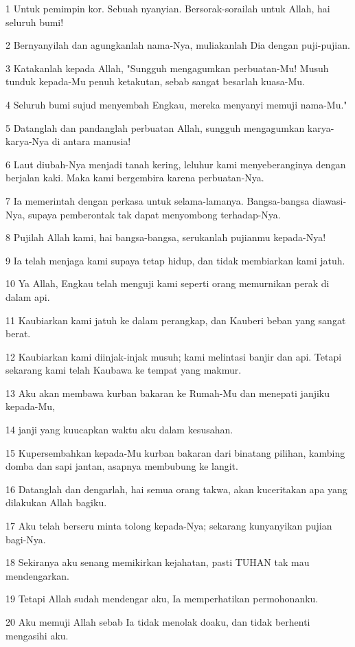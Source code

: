 \par 1 Untuk pemimpin kor. Sebuah nyanyian. Bersorak-sorailah untuk Allah, hai seluruh bumi!
\par 2 Bernyanyilah dan agungkanlah nama-Nya, muliakanlah Dia dengan puji-pujian.
\par 3 Katakanlah kepada Allah, "Sungguh mengagumkan perbuatan-Mu! Musuh tunduk kepada-Mu penuh ketakutan, sebab sangat besarlah kuasa-Mu.
\par 4 Seluruh bumi sujud menyembah Engkau, mereka menyanyi memuji nama-Mu."
\par 5 Datanglah dan pandanglah perbuatan Allah, sungguh mengagumkan karya-karya-Nya di antara manusia!
\par 6 Laut diubah-Nya menjadi tanah kering, leluhur kami menyeberanginya dengan berjalan kaki. Maka kami bergembira karena perbuatan-Nya.
\par 7 Ia memerintah dengan perkasa untuk selama-lamanya. Bangsa-bangsa diawasi-Nya, supaya pemberontak tak dapat menyombong terhadap-Nya.
\par 8 Pujilah Allah kami, hai bangsa-bangsa, serukanlah pujianmu kepada-Nya!
\par 9 Ia telah menjaga kami supaya tetap hidup, dan tidak membiarkan kami jatuh.
\par 10 Ya Allah, Engkau telah menguji kami seperti orang memurnikan perak di dalam api.
\par 11 Kaubiarkan kami jatuh ke dalam perangkap, dan Kauberi beban yang sangat berat.
\par 12 Kaubiarkan kami diinjak-injak musuh; kami melintasi banjir dan api. Tetapi sekarang kami telah Kaubawa ke tempat yang makmur.
\par 13 Aku akan membawa kurban bakaran ke Rumah-Mu dan menepati janjiku kepada-Mu,
\par 14 janji yang kuucapkan waktu aku dalam kesusahan.
\par 15 Kupersembahkan kepada-Mu kurban bakaran dari binatang pilihan, kambing domba dan sapi jantan, asapnya membubung ke langit.
\par 16 Datanglah dan dengarlah, hai semua orang takwa, akan kuceritakan apa yang dilakukan Allah bagiku.
\par 17 Aku telah berseru minta tolong kepada-Nya; sekarang kunyanyikan pujian bagi-Nya.
\par 18 Sekiranya aku senang memikirkan kejahatan, pasti TUHAN tak mau mendengarkan.
\par 19 Tetapi Allah sudah mendengar aku, Ia memperhatikan permohonanku.
\par 20 Aku memuji Allah sebab Ia tidak menolak doaku, dan tidak berhenti mengasihi aku.


